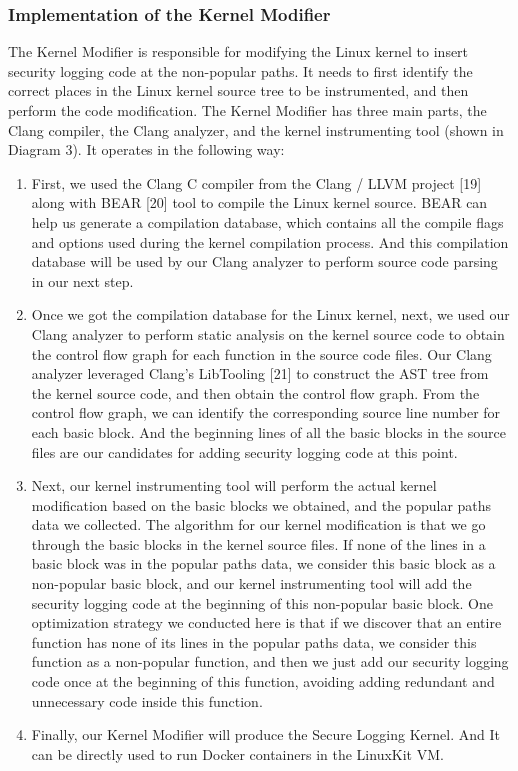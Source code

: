 \subsubsection{Implementation of the Kernel Modifier}
\label{sec.design.implementation.kernel_modifier}
The Kernel Modifier is responsible for modifying the Linux kernel to insert security logging code at the non-popular paths. 
It needs to first identify the correct places in the Linux kernel source tree to be instrumented, and then perform the code modification. 
The Kernel Modifier has three main parts, the Clang compiler, the Clang analyzer, and the kernel instrumenting tool (shown in Diagram 3). 
It operates in the following way: 
\begin{enumerate}
	\item First, we used the Clang C compiler from the Clang / LLVM project [19] along with BEAR [20] tool to compile the Linux kernel source. 
	BEAR can help us generate a compilation database, which contains all the compile flags and options used during the kernel compilation process. 
	And this compilation database will be used by our Clang analyzer to perform source code parsing in our next step. 
	\item Once we got the compilation database for the Linux kernel, next, we used our Clang analyzer to perform static analysis on the kernel source code to obtain 
	the control flow graph for each function in the source code files. Our Clang analyzer leveraged Clang’s LibTooling [21] to construct the AST tree from the kernel source code, 
	and then obtain the control flow graph. From the control flow graph, we can identify the corresponding source line number for each basic block. 
	And the beginning lines of all the basic blocks in the source files are our candidates for adding security logging code at this point. 
	\item Next, our kernel instrumenting tool will perform the actual kernel modification based on the basic blocks we obtained, and the popular paths data we collected. 
	The algorithm for our kernel modification is that we go through the basic blocks in the kernel source files. If none of the lines in a basic block was in the popular paths data, 
	we consider this basic block as a non-popular basic block, and our kernel instrumenting tool will add the security logging code at the beginning of this non-popular basic block. 
	One optimization strategy we conducted here is that if we discover that an entire function has none of its lines in the popular paths data, 
	we consider this function as a non-popular function, and then we just add our security logging code once at the beginning of this function, 
	avoiding adding redundant and unnecessary code inside this function. 
	\item Finally, our Kernel Modifier will produce the Secure Logging Kernel. And It can be directly used to run Docker containers in the LinuxKit VM. 
\end{enumerate}

